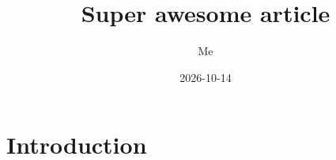 \documentclass{article}
\title{Super awesome article}
\author{Me}
\date{2026-10-14}
\begin{document}
\maketitle

\section{Introduction}
\end{document}
